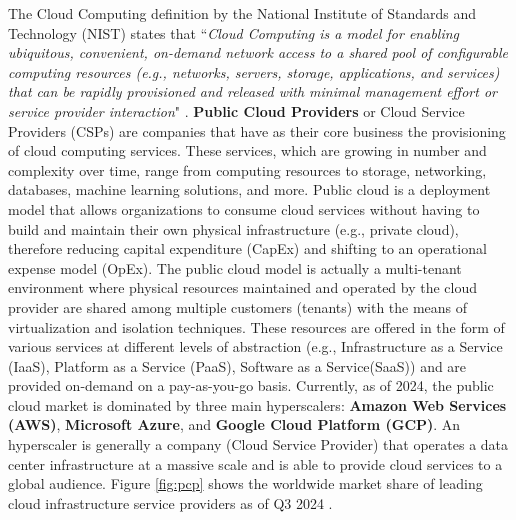 The Cloud Computing definition by the National Institute of Standards and Technology (NIST) \cite{nist_cloud_computing} states that ``\textit{Cloud Computing is a model for enabling ubiquitous, convenient, on-demand network access to a shared pool of configurable computing resources (e.g., networks, servers, storage, applications, and services) that can be rapidly provisioned and released with minimal management effort or service provider interaction}" \cite{nist_cloud_computing}.
\textbf{Public Cloud Providers} or Cloud Service Providers (CSPs) are companies that have as their core business the provisioning of cloud computing services. 
These services, which are growing in number and complexity over time, range from computing resources to storage, networking, databases, machine learning solutions, and more. 
Public cloud is a deployment model that allows organizations to consume cloud services without having to build and maintain their own physical infrastructure (e.g., private cloud), therefore reducing capital expenditure (CapEx) and shifting to an operational expense model (OpEx). 
The public cloud model is actually a multi-tenant environment where physical resources maintained and operated by the cloud provider are shared among multiple customers (tenants) with the means of virtualization and isolation techniques.
These resources are offered in the form of various services at different levels of abstraction (e.g., Infrastructure as a Service (IaaS), Platform as a Service (PaaS), Software as a Service(SaaS)) and are provided on-demand on a pay-as-you-go basis.
Currently, as of 2024, the public cloud market is dominated by three main hyperscalers: \textbf{Amazon Web Services (AWS)}, \textbf{Microsoft Azure}, and \textbf{Google Cloud Platform (GCP)}.
An hyperscaler is generally a company (Cloud Service Provider) that operates a data center infrastructure at a massive scale and is able to provide cloud services to a global audience.
Figure \ref{fig:pcp} shows the worldwide market share of leading cloud infrastructure service providers as of Q3 2024 \cite{statista_cloud_market_share}.

